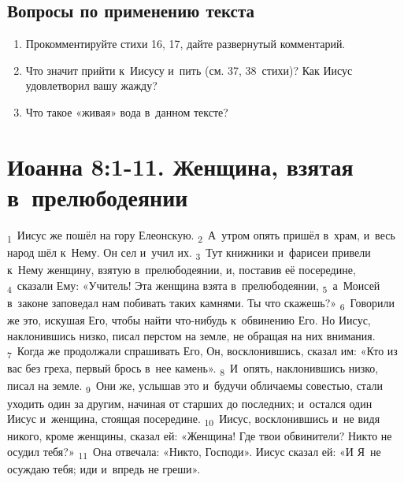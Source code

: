 \documentclass[a4paper,12pt]{article}
\begin{document}
\subsection*{Вопросы по применению текста} 
\begin{enumerate}
    \item Прокомментируйте стихи 16, 17, дайте развернутый комментарий.
    
    \myline
    
    \myline
    \item Что значит прийти к~Иисусу и~пить (см. 37, 38~стихи)? Как Иисус удовлетворил вашу жажду? 
    
    \myline
    
    \myline
    \item Что такое «живая» вода в~данном тексте? 
    
    \myline
    
    \myline
\end{enumerate}


\section{Иоанна 8:1-11. Женщина, взятая в~прелюбодеянии}

\textsubscript{1}~Иисус же пошёл на гору Елеонскую.
\textsubscript{2}~А~утром опять пришёл в~храм, и~весь народ шёл к~Нему. Он сел и~учил их.
\textsubscript{3}~Тут книжники и~фарисеи привели к~Нему женщину, взятую в~прелюбодеянии, и, поставив её посередине,
\textsubscript{4}~сказали Ему: «Учитель! Эта женщина взята в~прелюбодеянии,
\textsubscript{5}~а~Моисей в~законе заповедал нам побивать таких камнями. Ты что скажешь?»
\textsubscript{6}~Говорили же это, искушая Его, чтобы найти что-нибудь к~обвинению Его. Но Иисус, наклонившись низко, писал перстом на земле, не обращая на них внимания.
\textsubscript{7}~Когда же продолжали спрашивать Его, Он, восклонившись, сказал им: «Кто из вас без греха, первый брось в~нее камень».
\textsubscript{8}~И~опять, наклонившись низко, писал на земле.
\textsubscript{9}~Они же, услышав это и~будучи обличаемы совестью, стали уходить один за другим, начиная от старших до последних; и~остался один Иисус и~женщина, стоящая посередине.
\textsubscript{10}~Иисус, восклонившись и~не видя никого, кроме женщины, сказал ей: «Женщина! Где твои обвинители? Никто не осудил тебя?»
\textsubscript{11}~Она отвечала: «Никто, Господи». Иисус сказал ей: «И Я~не осуждаю тебя; иди и~впредь не греши». 
\end{document}
